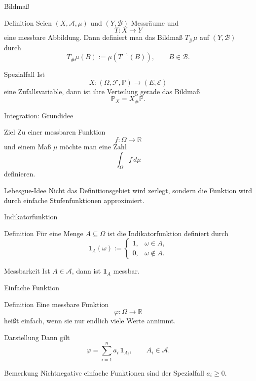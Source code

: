 \documentclass{beamer}
\begin{document}
\begin{frame}{Bildmaß}
\begin{block}{Definition}
Seien \((X,\mathcal A,\mu)\) und \((Y,\mathcal B)\) Messräume und
\[
T\colon X\to Y
\]
eine messbare Abbildung.
Dann definiert man das Bildmaß \(T_\#\mu\) auf \((Y,\mathcal B)\) durch
\[
T_\#\mu(B):=\mu(T^{-1}(B)),
\qquad B\in\mathcal B.
\]
\end{block}

\begin{block}{Spezialfall}
Ist
\[
X\colon (\Omega,\mathcal F,\mathbb P)\to(E,\mathcal E)
\]
eine Zufallsvariable, dann ist ihre Verteilung gerade das Bildmaß
\[
\mathbb P_X=X_\#\mathbb P.
\]
\end{block}
\end{frame}

\begin{frame}{Integration: Grundidee}
\begin{block}{Ziel}
Zu einer messbaren Funktion
\[
f\colon \Omega\to\mathbb R
\]
und einem Maß \(\mu\) möchte man eine Zahl
\[
\int_\Omega f\,d\mu
\]
definieren.
\end{block}

\begin{block}{Lebesgue-Idee}
Nicht das Definitionsgebiet wird zerlegt, sondern die Funktion wird durch einfache Stufenfunktionen approximiert.
\end{block}
\end{frame}

\begin{frame}{Indikatorfunktion}
\begin{block}{Definition}
Für eine Menge \(A\subseteq\Omega\) ist die Indikatorfunktion definiert durch
\[
\mathbf 1_A(\omega):=
\begin{cases}
1, & \omega\in A,\\
0, & \omega\notin A.
\end{cases}
\]
\end{block}

\begin{block}{Messbarkeit}
Ist \(A\in\mathcal A\), dann ist \(\mathbf 1_A\) messbar.
\end{block}
\end{frame}

\begin{frame}{Einfache Funktion}
\begin{block}{Definition}
Eine messbare Funktion
\[
\varphi\colon \Omega\to\mathbb R
\]
hei\ss{}t einfach, wenn sie nur endlich viele Werte annimmt.
\end{block}

\begin{block}{Darstellung}
Dann gilt
\[
\varphi=\sum_{i=1}^n a_i\,\mathbf 1_{A_i},
\qquad A_i\in\mathcal A.
\]
\end{block}

\begin{block}{Bemerkung}
Nichtnegative einfache Funktionen sind der Spezialfall \(a_i\ge 0\).
\end{block}
\end{frame}
\end{document}
